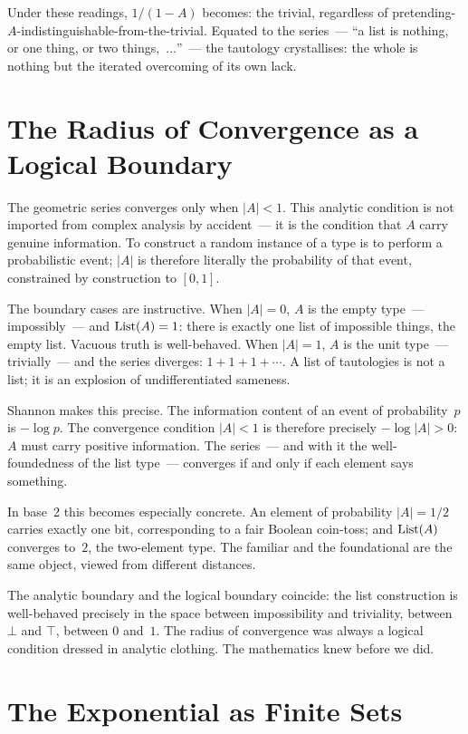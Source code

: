 Under these readings, $1/(1-A)$ becomes: {\itfont the trivial, regardless of
pretending-$A$-indistinguishable-from-the-trivial.\/} Equated to the series~---
``a list is nothing, or one thing, or two things,~$\ldots$''~--- the tautology
crystallises: the whole is nothing but the iterated overcoming of its own lack.

\section{The Radius of Convergence as a Logical Boundary}

The geometric series converges only when $|A| < 1$. This analytic condition is not
imported from complex analysis by accident~--- it is the condition that $A$ carry
genuine information. To construct a random instance of a type is to perform a
probabilistic event; $|A|$ is therefore literally the probability of that event,
constrained by construction to $[0,1]$.

The boundary cases are instructive. When $|A| = 0$, $A$ is the empty type~---
{\itfont impossibly\/}~--- and $\hbox{List}(A) = 1$: there is exactly one list of
impossible things, the empty list. Vacuous truth is well-behaved. When $|A| = 1$,
$A$ is the unit type~--- {\itfont trivially\/}~--- and the series diverges:
$1 + 1 + 1 + \cdots$. A list of tautologies is not a list; it is an explosion
of undifferentiated sameness.

Shannon makes this precise. The information content of an event of probability~$p$
is $-\log p$. The convergence condition $|A| < 1$ is therefore precisely
$-\log|A| > 0$: $A$ must carry positive information. The series~--- and with it
the well-foundedness of the list type~--- converges if and only if each element
says something.

In base~2 this becomes especially concrete. An element of probability $|A| = 1/2$
carries exactly one bit, corresponding to a fair Boolean coin-toss; and
$\hbox{List}(A)$ converges to~$2$, the two-element type. The familiar and the
foundational are the same object, viewed from different distances.

The analytic boundary and the logical boundary coincide: the list construction is
well-behaved precisely in the space between impossibility and triviality, between
$\bot$ and $\top$, between $0$ and~$1$. The radius of convergence was always a
logical condition dressed in analytic clothing. {\itfont The mathematics knew before we did.\/}

\section{The Exponential as Finite Sets}


